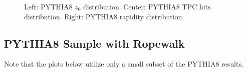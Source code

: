 \begin{figure}[H]
\centering
{}\hfill
{}\hfill %
\hfill %
\caption{Left: PYTHIA8 $z_0$ distribution. Center: PYTHIA8 TPC hits distribution. Right: PYTHIA8 rapidity distribution.}
\end{figure}


\subsection{PYTHIA8 Sample with Ropewalk}

Note that the plots below utilize only a small subset of the PYTHIA8 results.

